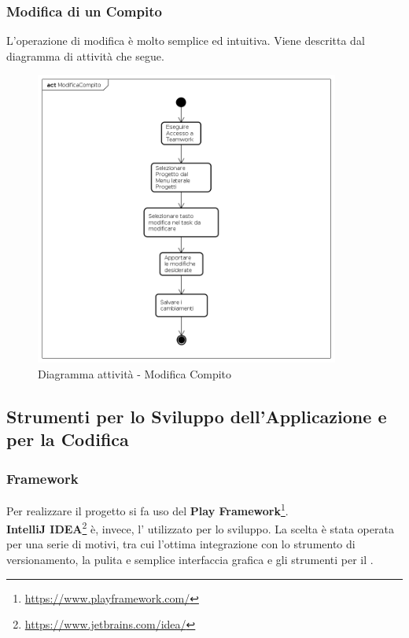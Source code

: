 \subsubsection{Modifica di un Compito}
L'operazione di modifica è molto semplice ed intuitiva. Viene descritta dal diagramma di attività che segue.
\begin{figure}[H]
\centering
\includegraphics[width=10cm]{ModificaCompito.png}
\caption{Diagramma attività - Modifica Compito}
\end{figure}

\subsection{Strumenti per lo Sviluppo dell'Applicazione e per la Codifica}
\subsubsection{Framework}
Per realizzare il progetto si fa uso del  \textbf{Play Framework}\footnote[5]{\url{https://www.playframework.com/}}. \\
\textbf{IntelliJ IDEA}\footnote[6]{\url{https://www.jetbrains.com/idea/}} è, invece, l' utilizzato per lo sviluppo. La scelta è stata operata per una serie di motivi, tra cui l'ottima integrazione con lo strumento di versionamento, la pulita e semplice interfaccia grafica e gli strumenti per il .
